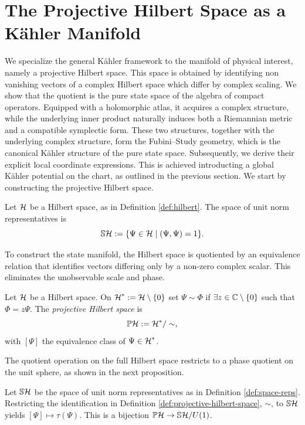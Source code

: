 \section{The Projective Hilbert Space as a Kähler Manifold}
\label{sec:ph-kahler}
We specialize the general Kähler framework to the manifold of physical interest, namely a projective Hilbert space. This space is obtained by identifying non vanishing vectors of a complex Hilbert space which differ by complex scaling. We show that the quotient is the pure state space of the algebra of compact operators. Equipped with a holomorphic atlas, it acquires a complex structure, while the underlying inner product naturally induces both a Riemannian metric and a compatible symplectic form. These two structures, together with the underlying complex structure, form the Fubini–Study geometry, which is the canonical Kähler structure of the pure state space. Subsequently, we derive their explicit local coordinate expressions. This is achieved introducting a global Kähler potential on the chart, as outlined in the previous section. We start by constructing the projective Hilbert space.

\begin{definition}\label{def:space-reps}
	Let $\H$ be a Hilbert space, as in Definition \ref{def:hilbert}. The space of unit norm representatives is $$\mathbb{S}\H:=\{\Psi\in\H\mid(\Psi,\Psi)=1\}.$$
\end{definition}

To construct the state manifold, the Hilbert space is quotiented by an equivalence relation that identifies vectors differing only by a non-zero complex scalar. This eliminates the unobservable scale and phase.

\begin{definition}
	\label{def:projective-hilbert-space}
	Let $\H$ be a Hilbert space. On $\H^*:=\H\setminus\{0\}$ set
	$\Psi\sim\Phi$ if $\exists z\in\mathbb{C}\setminus\{0\}$ such that $\Phi=z\Psi$. The
	\emph{projective Hilbert space} is
	\[
	\PH:=\H^*/\sim,
	\]
	with $[\Psi]$ the equivalence class of $\Psi\in\H^*$.
\end{definition}

\noindent The quotient operation on the full Hilbert space restricts to a phase quotient on the unit sphere, as shown in the next proposition.

\begin{proposition}
	\label{prop:ph-quotient-pure-states}
	Let $\mathbb{S}\H$ be the space of unit norm representatives as in Definition \ref{def:space-reps}. Restricting the identification in Definition \ref{def:projective-hilbert-space}, $\sim$, to $\mathbb{S}\H$ yields $[\Psi]\mapsto\tau(\Psi)$. This is a bijection $\PH\to \mathbb{S}\H/U(1)$.
\end{proposition}


